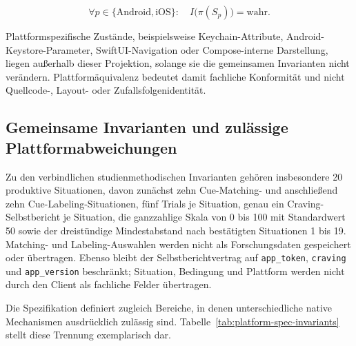 \begin{neu}
\[
\forall p\in\{\mathrm{Android},\mathrm{iOS}\}:\quad I\bigl(\pi(S_p)\bigr)=\mathrm{wahr}.
\]

Plattformspezifische Zustände, beispielsweise Keychain-Attribute, Android-Keystore-Parameter, SwiftUI-Navigation oder Compose-interne Darstellung, liegen außerhalb dieser Projektion, solange sie die gemeinsamen Invarianten nicht verändern. Plattformäquivalenz bedeutet damit fachliche Konformität und nicht Quellcode-, Layout- oder Zufallsfolgenidentität.

\subsection{Gemeinsame Invarianten und zulässige Plattformabweichungen}

Zu den verbindlichen studienmethodischen Invarianten gehören insbesondere 20 produktive Situationen, davon zunächst zehn Cue-Matching- und anschließend zehn Cue-Labeling-Situationen, fünf Trials je Situation, genau ein Craving-Selbstbericht je Situation, die ganzzahlige Skala von 0 bis 100 mit Standardwert 50 sowie der dreistündige Mindestabstand nach bestätigten Situationen 1 bis 19. Matching- und Labeling-Auswahlen werden nicht als Forschungsdaten gespeichert oder übertragen. Ebenso bleibt der Selbstberichtvertrag auf \texttt{app\_token}, \texttt{craving} und \texttt{app\_version} beschränkt; Situation, Bedingung und Plattform werden nicht durch den Client als fachliche Felder übertragen.

Die Spezifikation definiert zugleich Bereiche, in denen unterschiedliche native Mechanismen ausdrücklich zulässig sind. Tabelle~\ref{tab:platform-spec-invariants} stellt diese Trennung exemplarisch dar.


\end{neu}

